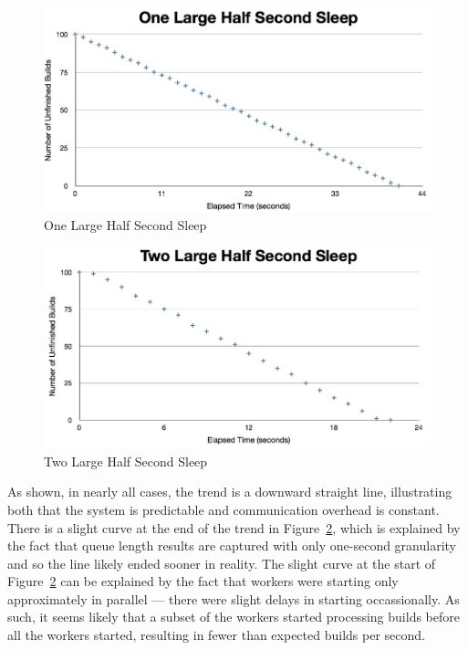 \documentclass{scrartcl}
\begin{document}
\begin{figure}[here]
  \begin{center}
    \includegraphics[scale=0.45]{raw_data/sleep0.5/one_large/graph.jpg}
  \end{center}
  \caption{One Large Half Second Sleep}
  \label{fig:sleephalf_one_large_queuelength}
\end{figure}

\begin{figure}[here]
  \begin{center}
    \includegraphics[scale=0.45]{raw_data/sleep0.5/two_large/graph.jpg}
  \end{center}
  \caption{Two Large Half Second Sleep}
  \label{fig:sleephalf_two_large_queuelength}
\end{figure}

As shown, in nearly all cases, the trend is a downward straight line, illustrating both that the system is predictable and communication overhead is constant.
There is a slight curve at the end of the trend in Figure~\ref{fig:sleephalf_two_large_queuelength}, which is explained by the fact that queue length results are captured with only one-second granularity and so the line likely ended sooner in reality.
The slight curve at the start of Figure~\ref{fig:sleephalf_two_large_queuelength} can be explained by the fact that workers were starting only approximately in parallel --- there were slight delays in starting occassionally.
As such, it seems likely that a subset of the workers started processing builds before all the workers started, resulting in fewer than expected builds per second.
\end{document}
